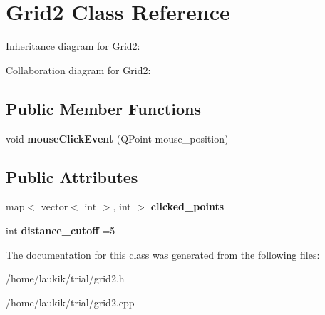 \hypertarget{classGrid2}{}\section{Grid2 Class Reference}
\label{classGrid2}


Inheritance diagram for Grid2\+:


Collaboration diagram for Grid2\+:
\subsection*{Public Member Functions}
\begin{DoxyCompactItemize}
\item 
\mbox{\label{classGrid2_ae6dc091b0fc5acfa3f8a14c9135be260}} 
void {\bfseries mouse\+Click\+Event} (Q\+Point mouse\+\_\+position)
\end{DoxyCompactItemize}
\subsection*{Public Attributes}
\begin{DoxyCompactItemize}
\item 
\mbox{\label{classGrid2_a832ac2f83a03bf70b9dff48729056987}} 
map$<$ vector$<$ int $>$, int $>$ {\bfseries clicked\+\_\+points}
\item 
\mbox{\label{classGrid2_a017d14e5342a99b37b1533037ceae3cd}} 
int {\bfseries distance\+\_\+cutoff} =5
\end{DoxyCompactItemize}


The documentation for this class was generated from the following files\+:\begin{DoxyCompactItemize}
\item 
/home/laukik/trial/grid2.\+h\item 
/home/laukik/trial/grid2.\+cpp\end{DoxyCompactItemize}

